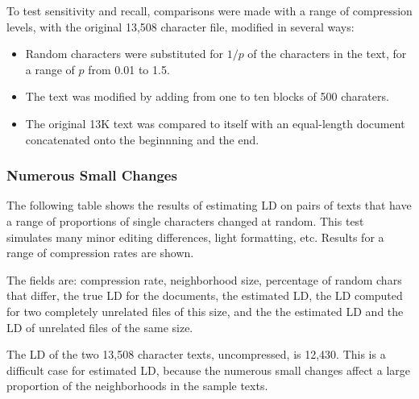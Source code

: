 \documentclass[html]{article}    %
\begin{document}
To test sensitivity and recall, comparisons were made with a range of
compression levels, with the original 13,508 character file, modified in several ways:

\begin{itemize}    
  \item { Random characters were substituted for $1/p$ of the characters in the
  text, for a range of $p$ from  0.01 to 1.5.}
  \item { The text was modified by adding from one to ten blocks of 500
  charaters.}
  \item { 
  	The original 13K text was compared to itself with an equal-length document
  	concatenated onto the beginnning and the end. }
\end{itemize}    



\subsubsection{Numerous Small Changes}
The following table shows the results of estimating LD  on pairs of texts that have a 
range of proportions of single characters changed at random. 
This test simulates many minor editing differences, light formatting, etc. 
Results for a range of compression rates are shown.

The fields are: compression rate, neighborhood size, percentage of random chars that differ, 
the true LD for the documents, the estimated LD, the LD computed for two
completely unrelated files of this size, and the the estimated LD and the LD of 
unrelated files of the same size. 

The LD of the two 13,508 character texts, uncompressed, is 12,430. 
This is a difficult case for estimated LD, because the numerous small changes
affect a large proportion of the neighborhoods in the sample texts.
\end{document}
